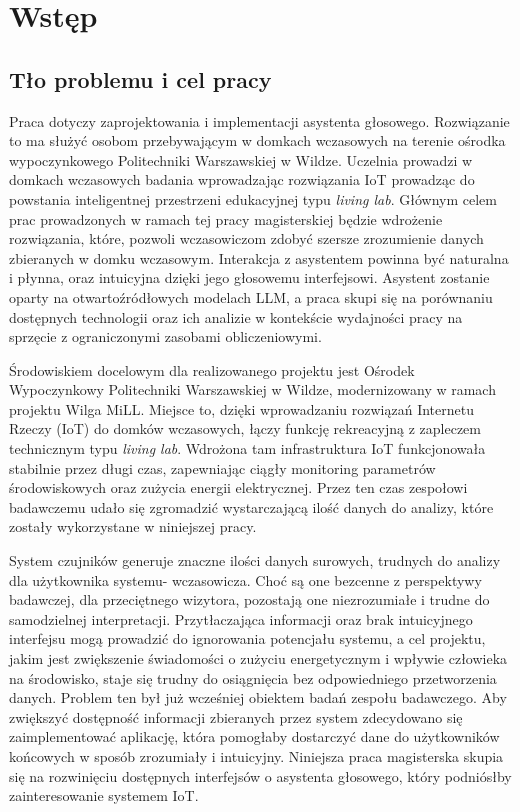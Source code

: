 \newpage
\section{Wstęp}

\subsection{Tło problemu i cel pracy}

Praca dotyczy zaprojektowania i implementacji asystenta głosowego. Rozwiązanie to ma  służyć osobom przebywającym w domkach wczasowych na terenie ośrodka wypoczynkowego Politechniki Warszawskiej w Wildze. Uczelnia prowadzi w domkach wczasowych badania wprowadzając rozwiązania IoT prowadząc do powstania inteligentnej przestrzeni edukacyjnej typu \textit{living lab}. Głównym celem prac prowadzonych w ramach tej pracy magisterskiej będzie wdrożenie rozwiązania, które, pozwoli wczasowiczom zdobyć szersze zrozumienie danych zbieranych w domku wczasowym. Interakcja z asystentem powinna być naturalna i płynna, oraz intuicyjna dzięki jego głosowemu interfejsowi. Asystent zostanie oparty na otwartoźródłowych modelach LLM, a praca skupi się na porównaniu dostępnych technologii oraz ich analizie w kontekście wydajności pracy na sprzęcie z ograniczonymi zasobami obliczeniowymi.

Środowiskiem docelowym dla realizowanego projektu jest Ośrodek Wypoczynkowy Politechniki Warszawskiej w Wildze, modernizowany w ramach projektu Wilga MiLL. Miejsce to, dzięki wprowadzaniu rozwiązań Internetu Rzeczy (IoT) do domków wczasowych, łączy funkcję rekreacyjną z zapleczem technicznym typu \textit{living lab}. Wdrożona tam infrastruktura IoT funkcjonowała stabilnie przez długi czas, zapewniając ciągły monitoring parametrów środowiskowych oraz zużycia energii elektrycznej. Przez ten czas zespołowi badawczemu udało się zgromadzić wystarczającą ilość danych do analizy, które zostały wykorzystane w niniejszej pracy.

System czujników generuje znaczne ilości danych surowych, trudnych do analizy dla użytkownika systemu- wczasowicza. Choć są one bezcenne z perspektywy badawczej, dla przeciętnego wizytora, pozostają one niezrozumiałe i trudne do samodzielnej interpretacji. Przytłaczająca informacji oraz brak intuicyjnego interfejsu mogą prowadzić do ignorowania potencjału systemu, a cel projektu, jakim jest zwiększenie świadomości o zużyciu energetycznym i wpływie człowieka na środowisko, staje się trudny do osiągnięcia bez odpowiedniego przetworzenia danych. Problem ten był już wcześniej obiektem badań zespołu badawczego. Aby zwiększyć dostępność informacji zbieranych przez system zdecydowano się zaimplementować aplikację, która pomogłaby dostarczyć dane do użytkowników końcowych w sposób zrozumiały i intuicyjny. Niniejsza praca magisterska skupia się na rozwinięciu dostępnych interfejsów o asystenta głosowego, który podniósłby zainteresowanie systemem IoT. 

